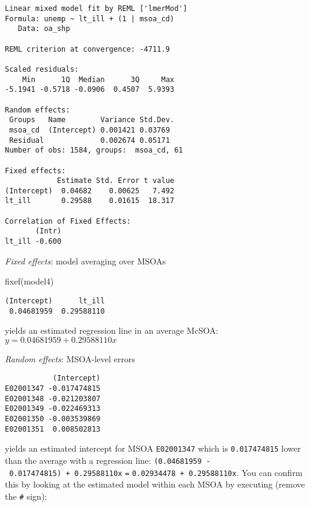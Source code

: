 \documentclass[
  letterpaper,
  krantz2]{style/krantz}
\newenvironment{Shaded}{\begin{snugshade}}{\end{snugshade}}
\newcommand{\DecValTok}[1]{\textcolor[rgb]{0.68,0.00,0.00}{#1}}
\newcommand{\FunctionTok}[1]{\textcolor[rgb]{0.28,0.35,0.67}{#1}}
\newcommand{\NormalTok}[1]{\textcolor[rgb]{0.00,0.23,0.31}{#1}}
\newcommand{\OtherTok}[1]{\textcolor[rgb]{0.00,0.23,0.31}{#1}}
\newcommand{\SpecialCharTok}[1]{\textcolor[rgb]{0.37,0.37,0.37}{#1}}
\begin{document}
\begin{verbatim}
Linear mixed model fit by REML ['lmerMod']
Formula: unemp ~ lt_ill + (1 | msoa_cd)
   Data: oa_shp

REML criterion at convergence: -4711.9

Scaled residuals: 
    Min      1Q  Median      3Q     Max 
-5.1941 -0.5718 -0.0906  0.4507  5.9393 

Random effects:
 Groups   Name        Variance Std.Dev.
 msoa_cd  (Intercept) 0.001421 0.03769 
 Residual             0.002674 0.05171 
Number of obs: 1584, groups:  msoa_cd, 61

Fixed effects:
            Estimate Std. Error t value
(Intercept)  0.04682    0.00625   7.492
lt_ill       0.29588    0.01615  18.317

Correlation of Fixed Effects:
       (Intr)
lt_ill -0.600
\end{verbatim}

\emph{Fixed effects}: model averaging over MSOAs

\begin{Shaded}
\begin{Highlighting}[]
\FunctionTok{fixef}\NormalTok{(model4)}
\end{Highlighting}
\end{Shaded}

\begin{verbatim}
(Intercept)      lt_ill 
 0.04681959  0.29588110 
\end{verbatim}

yields an estimated regression line in an average McSOA:
\(y = 0.04681959 + 0.29588110x\)

\emph{Random effects}: MSOA-level errors

\begin{Shaded}
\end{Shaded}

\begin{verbatim}
           (Intercept)
E02001347 -0.017474815
E02001348 -0.021203807
E02001349 -0.022469313
E02001350 -0.003539869
E02001351  0.008502813
\end{verbatim}

yields an estimated intercept for MSOA \texttt{E02001347} which is
\texttt{0.017474815} lower than the average with a regression line:
\texttt{(0.04681959\ -\ 0.017474815)\ +\ 0.29588110x} \texttt{=}
\texttt{0.02934478\ +\ 0.29588110x}. You can confirm this by looking at
the estimated model within each MSOA by executing (remove the
\texttt{\#} sign):
\end{document}
